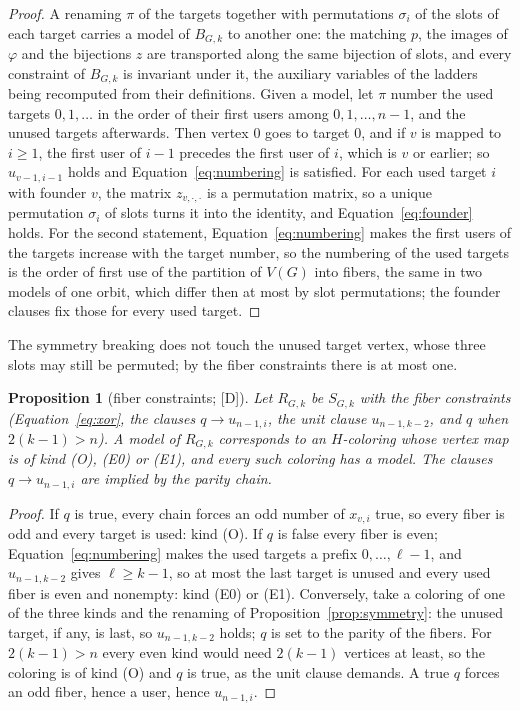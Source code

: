 \documentclass[11pt]{article}
\newtheorem{proposition}[theorem]{Proposition}
\theoremstyle{definition}
\theoremstyle{remark}
\newcommand{\evD}{\textnormal{[D]}}
\begin{document}
\begin{proof}
A renaming $\pi$ of the targets together with permutations $\sigma_i$ of the slots of each target carries a model of $B_{G,k}$ to another one: the matching $p$, the images of $\varphi$ and the bijections $z$ are
transported along the same bijection of slots, and every constraint of $B_{G,k}$ is invariant under it, the auxiliary variables of the ladders being recomputed from their definitions. Given a model, let $\pi$ number the used targets $0, 1, \dots$ in the order of their first users among
$0, 1, \dots, n-1$, and the unused targets afterwards. Then vertex $0$ goes to target $0$, and if $v$ is mapped to $i \ge 1$, the first user of $i-1$ precedes the first user of $i$, which is $v$ or earlier;
so $u_{v-1,i-1}$ holds and Equation~\eqref{eq:numbering} is satisfied. For each used target $i$ with founder $v$, the matrix $z_{v,\cdot,\cdot}$ is a permutation matrix, so a unique permutation
$\sigma_i$ of slots turns it into the identity, and Equation~\eqref{eq:founder} holds. For the second statement, Equation~\eqref{eq:numbering} makes the first users of the targets increase with the target
number, so the numbering of the used targets is the order of first use of the partition of $V(G)$ into fibers, the same in two models of one orbit, which differ then at most by slot permutations;
the founder clauses fix those for every used target.
\end{proof}

The symmetry breaking does not touch the unused target vertex, whose three slots may still be permuted; by the fiber constraints there is at most one.

\begin{proposition}[fiber constraints; \evD]\label{prop:fibers}
Let $R_{G,k}$ be $S_{G,k}$ with the fiber constraints (Equation~\eqref{eq:xor}, the clauses $q \to u_{n-1,i}$, the unit clause $u_{n-1,k-2}$, and $q$ when $2(k-1) > n$). A model of $R_{G,k}$ corresponds to
an $H$-coloring whose vertex map is of kind (O), (E0) or (E1), and every such coloring has a model. The clauses $q \to u_{n-1,i}$ are implied by the parity chain.
\end{proposition}

\begin{proof}
If $q$ is true, every chain forces an odd number of $x_{v,i}$ true, so every fiber is odd and every target is used: kind (O). If $q$ is false every fiber is even; Equation~\eqref{eq:numbering} makes the used targets a
prefix $0, \dots, \ell - 1$, and $u_{n-1,k-2}$ gives $\ell \ge k-1$, so at most the last target is unused and every used fiber is even and nonempty: kind (E0) or (E1). Conversely, take a
coloring of one of the three kinds and the renaming of Proposition~\ref{prop:symmetry}: the unused target, if any, is last, so $u_{n-1,k-2}$ holds; $q$ is set to the parity of the fibers. For $2(k-1) > n$ every even
kind would need $2(k-1)$ vertices at least, so the coloring is of kind (O) and $q$ is true, as the unit clause demands. A true $q$ forces an odd fiber, hence a user, hence $u_{n-1,i}$.
\end{proof}
\end{document}
